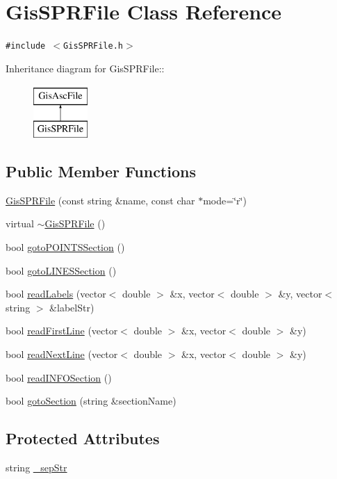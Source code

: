 \hypertarget{classGisSPRFile}{
\section{Gis\-SPRFile Class Reference}
\label{classGisSPRFile}
}
{\tt \#include $<$Gis\-SPRFile.h$>$}

Inheritance diagram for Gis\-SPRFile::\begin{figure}[H]
\begin{center}
\leavevmode
\includegraphics[height=2cm]{classGisSPRFile}
\end{center}
\end{figure}
\subsection*{Public Member Functions}
\begin{CompactItemize}
\item 
\hyperlink{classGisSPRFile_a0}{Gis\-SPRFile} (const string \&name, const char $\ast$mode=\char`\"{}r\char`\"{})
\item 
virtual \hyperlink{classGisSPRFile_a1}{$\sim$Gis\-SPRFile} ()
\item 
bool \hyperlink{classGisSPRFile_a2}{goto\-POINTSSection} ()
\item 
bool \hyperlink{classGisSPRFile_a3}{goto\-LINESSection} ()
\item 
bool \hyperlink{classGisSPRFile_a4}{read\-Labels} (vector$<$ double $>$ \&x, vector$<$ double $>$ \&y, vector$<$ string $>$ \&label\-Str)
\item 
bool \hyperlink{classGisSPRFile_a5}{read\-First\-Line} (vector$<$ double $>$ \&x, vector$<$ double $>$ \&y)
\item 
bool \hyperlink{classGisSPRFile_a6}{read\-Next\-Line} (vector$<$ double $>$ \&x, vector$<$ double $>$ \&y)
\item 
bool \hyperlink{classGisSPRFile_a7}{read\-INFOSection} ()
\item 
bool \hyperlink{classGisSPRFile_a8}{goto\-Section} (string \&section\-Name)
\end{CompactItemize}
\subsection*{Protected Attributes}
\begin{CompactItemize}
\item 
string \hyperlink{classGisSPRFile_p0}{\_\-sep\-Str}
\end{CompactItemize}
